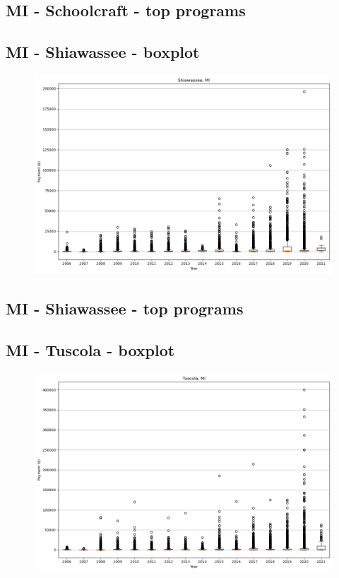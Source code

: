 \subsection*{MI - Schoolcraft - top programs}

\newpage
\subsection*{MI - Shiawassee - boxplot}
\begin{figure}[h]
\centering
\includegraphics[width=7in]{../output/boxplots/counties/Shiawassee-MI_boxplot.png}
\end{figure}


\subsection*{MI - Shiawassee - top programs}

\newpage
\subsection*{MI - Tuscola - boxplot}
\begin{figure}[h]
\centering
\includegraphics[width=7in]{../output/boxplots/counties/Tuscola-MI_boxplot.png}
\end{figure}


